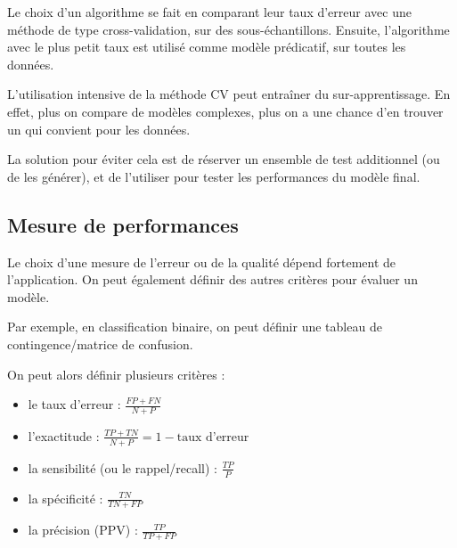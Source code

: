 Le choix d'un algorithme se fait en comparant leur taux d'erreur avec une méthode de type cross-validation, sur des sous-échantillons. Ensuite, l'algorithme avec le plus petit taux est utilisé comme modèle prédicatif, sur toutes les données.

L'utilisation intensive de la méthode CV peut entraîner du sur-apprentissage. En effet, plus on compare de modèles complexes, plus on a une chance d'en trouver un qui convient pour les données.

La solution pour éviter cela est de réserver un ensemble de test additionnel (ou de les générer), et de l'utiliser pour tester les performances du modèle final.

\subsection{Mesure de performances}

Le choix d'une mesure de l'erreur ou de la qualité dépend fortement de l'application. On peut également définir des autres critères pour évaluer un modèle.

Par exemple, en classification binaire, on peut définir une tableau de contingence/matrice de confusion.


On peut alors définir plusieurs critères :

\begin{itemize}
	\item le taux d'erreur : $\frac{FP + FN}{N + P}$
	\item l'exactitude : $\frac{TP + TN}{N + P} = 1 - \text{taux d'erreur}$
	\item la sensibilité (ou le rappel/recall) : $\frac{TP}{P}$
	\item la spécificité : $\frac{TN}{TN + FP}$
	\item la précision (PPV) : $\frac{TP}{TP + FP}$
\end{itemize}

